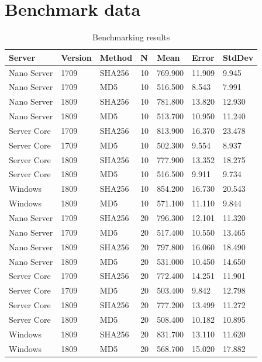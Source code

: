 \label{benchmarkdata}
\section{Benchmark data}
\begin{table}[h]
	\centering
	\begin{tabular}{ll|l|l|l|l|l}
		Server      & Version & Method & N  & Mean    & Error  & StdDev \\ \hline
		Nano Server & 1709    & SHA256 & 10 & 769.900 & 11.909 & 9.945  \\
		Nano Server & 1709    & MD5    & 10 & 516.500 & 8.543  & 7.991  \\
		Nano Server & 1809    & SHA256 & 10 & 781.800 & 13.820 & 12.930 \\
		Nano Server & 1809    & MD5    & 10 & 513.700 & 10.950 & 11.240 \\
		Server Core & 1709    & SHA256 & 10 & 813.900 & 16.370 & 23.478 \\
		Server Core & 1709    & MD5    & 10 & 502.300 & 9.554  & 8.937  \\
		Server Core & 1809    & SHA256 & 10 & 777.900 & 13.352 & 18.275 \\
		Server Core & 1809    & MD5    & 10 & 516.500 & 9.911  & 9.734  \\
		Windows     & 1809    & SHA256 & 10 & 854.200 & 16.730 & 20.543 \\
		Windows     & 1809    & MD5    & 10 & 571.100 & 11.110 & 9.844  \\
		Nano Server & 1709    & SHA256 & 20 & 796.300 & 12.101 & 11.320 \\
		Nano Server & 1709    & MD5    & 20 & 517.400 & 10.550 & 13.465 \\
		Nano Server & 1809    & SHA256 & 20 & 797.800 & 16.060 & 18.490 \\
		Nano Server & 1809    & MD5    & 20 & 531.000 & 10.450 & 14.650 \\
		Server Core & 1709    & SHA256 & 20 & 772.400 & 14.251 & 11.901 \\
		Server Core & 1709    & MD5    & 20 & 503.400 & 9.842  & 12.798 \\
		Server Core & 1809    & SHA256 & 20 & 777.200 & 13.499 & 11.272 \\
		Server Core & 1809    & MD5    & 20 & 508.400 & 10.182 & 10.895 \\
		Windows     & 1809    & SHA256 & 20 & 831.700 & 13.110 & 11.620 \\
		Windows     & 1809    & MD5    & 20 & 568.700 & 15.020 & 17.882
	\end{tabular}
	\label{BenchmarkData}
	\caption{Benchmarking results}
\end{table}
